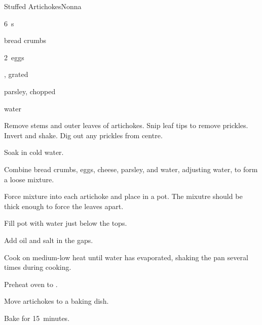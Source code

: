 \begin{recipe}{Stuffed Artichokes}{Nonna}{}

\begin{ingredients}
\item 6~s
\item {} bread crumbs
\item 2~eggs
\item {} , grated
\item {} parsley, chopped
\item {} water
\end{ingredients}

\begin{directions}
\item Remove stems and outer leaves of artichokes. Snip leaf tips to remove prickles. Invert and shake. Dig out any prickles from centre.
\item Soak in cold water.
\item Combine bread crumbs, eggs, cheese, parsley, and water, adjusting water, to form a loose mixture.
\item Force mixture into each artichoke and place in a pot. The mixutre should be thick enough to force the leaves apart.
\item Fill pot with water just below the tops.
\item Add oil and salt in the gaps.
\item Cook on medium-low heat until water has evaporated, shaking the pan several times during cooking.
\item Preheat oven to .
\item Move artichokes to a baking dish.
\item Bake for 15~minutes.
\end{directions}

\end{recipe}
